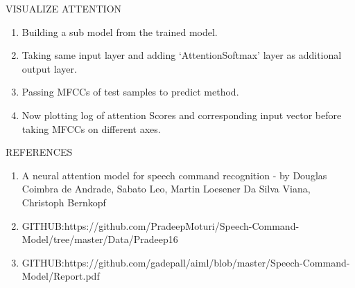 \documentclass[11pt]{beamer}
\begin{document}
\begin{frame}
{VISUALIZE ATTENTION}
\begin{enumerate}
    \item Building a sub model from the trained model. 
    \item Taking same input layer and adding ‘AttentionSoftmax’ layer as additional output layer.
    \item Passing MFCCs of test samples to predict method.
    \item Now plotting log of attention Scores and corresponding input vector before taking MFCCs on different axes.
    \end{enumerate}
\end{frame}
\begin{frame}
{REFERENCES}
\begin{enumerate}
    \item A neural attention model for speech command recognition - by Douglas Coimbra de Andrade, Sabato Leo, Martin Loesener Da Silva Viana, Christoph Bernkopf

    \item GITHUB:https://github.com/PradeepMoturi/Speech-Command-Model/tree/master/Data/Pradeep16
    \item GITHUB:https://github.com/gadepall/aiml/blob/master/Speech-Command-Model/Report.pdf
\end{enumerate}
\end{frame}
\end{document}
